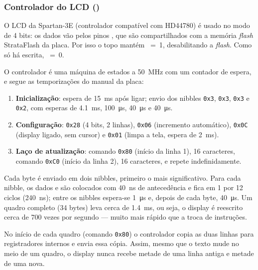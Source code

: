 \subsubsection{Controlador do LCD ()}

O LCD da Spartan-3E (controlador compatível com HD44780) é usado no modo de 4
bits: os dados vão pelos pinos , que são compartilhados com a
memória \emph{flash} StrataFlash da placa. Por isso o topo mantém
~=~1, desabilitando a \emph{flash}. Como só há escrita,
~=~0.

O controlador é uma máquina de estados a \SI{50}{\mega\hertz} com um contador
de espera, e segue as temporizações do manual da placa:

\begin{enumerate}[nosep]
  \item \textbf{Inicialização}: espera de \SI{15}{\milli\second} após ligar;
        envio dos nibbles \texttt{0x3}, \texttt{0x3}, \texttt{0x3} e
        \texttt{0x2}, com esperas de \SI{4,1}{\milli\second},
        \SI{100}{\micro\second}, \SI{40}{\micro\second} e
        \SI{40}{\micro\second}.
  \item \textbf{Configuração}: \texttt{0x28} (4 bits, 2 linhas),
        \texttt{0x06} (incremento automático), \texttt{0x0C} (display ligado,
        sem cursor) e \texttt{0x01} (limpa a tela, espera de
        \SI{2}{\milli\second}).
  \item \textbf{Laço de atualização}: comando \texttt{0x80} (início da linha
        1), 16 caracteres, comando \texttt{0xC0} (início da linha 2), 16
        caracteres, e repete indefinidamente.
\end{enumerate}

Cada byte é enviado em dois nibbles, primeiro o mais significativo. Para cada
nibble, os dados e  são colocados com \SI{40}{\nano\second} de
antecedência e  fica em 1 por 12 ciclos (\SI{240}{\nano\second});
entre os nibbles espera-se \SI{1}{\micro\second} e, depois de cada byte,
\SI{40}{\micro\second}. Um quadro completo (34 bytes) leva cerca de
\SI{1,4}{\milli\second}, ou seja, o display é reescrito cerca de 700 vezes por
segundo --- muito mais rápido que a troca de instruções.

No início de cada quadro (comando \texttt{0x80}) o controlador copia as duas
linhas para registradores internos e envia essa cópia. Assim, mesmo que o texto
mude no meio de um quadro, o display nunca recebe metade de uma linha antiga e
metade de uma nova.
